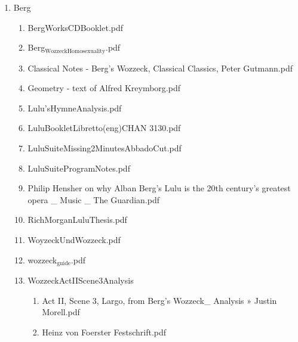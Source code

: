 \documentclass[11pt]{article}
\begin{document}
\begin{enumerate}
\item Berg
\label{sec-1-1-1-1-31-7-5}
\begin{enumerate}
\item BergWorksCDBooklet.pdf
\label{sec-1-1-1-1-31-7-5-1}

\item Berg$_{\text{WozzeckHomosexuality}}$.pdf
\label{sec-1-1-1-1-31-7-5-2}

\item Classical Notes - Berg's Wozzeck, Classical Classics, Peter Gutmann.pdf
\label{sec-1-1-1-1-31-7-5-3}

\item Geometry - text of Alfred Kreymborg.pdf
\label{sec-1-1-1-1-31-7-5-4}

\item Lulu'sHymneAnalysis.pdf
\label{sec-1-1-1-1-31-7-5-5}

\item LuluBookletLibretto(eng)CHAN 3130.pdf
\label{sec-1-1-1-1-31-7-5-6}

\item LuluSuiteMissing2MinutesAbbadoCut.pdf
\label{sec-1-1-1-1-31-7-5-7}

\item LuluSuiteProgramNotes.pdf
\label{sec-1-1-1-1-31-7-5-8}

\item Philip Hensher on why Alban Berg's Lulu is the 20th century's greatest opera \_ Music \_ The Guardian.pdf
\label{sec-1-1-1-1-31-7-5-9}

\item RichMorganLuluThesis.pdf
\label{sec-1-1-1-1-31-7-5-10}

\item WoyzeckUndWozzeck.pdf
\label{sec-1-1-1-1-31-7-5-11}

\item wozzeck$_{\text{guide}}$.pdf
\label{sec-1-1-1-1-31-7-5-12}

\item WozzeckActIIScene3Analysis
\label{sec-1-1-1-1-31-7-5-13}
\begin{enumerate}
\item Act II, Scene 3, Largo, from Berg’s Wozzeck\_ Analysis » Justin Morell.pdf
\label{sec-1-1-1-1-31-7-5-13-1}

\item Heinz von Foerster Festschrift.pdf
\label{sec-1-1-1-1-31-7-5-13-2}
\end{enumerate}
\end{enumerate}


\end{enumerate}
\end{document}
